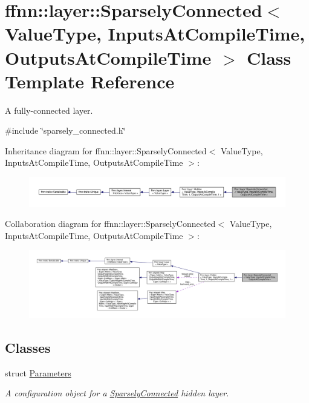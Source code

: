 \hypertarget{classffnn_1_1layer_1_1_sparsely_connected}{\section{ffnn\-:\-:layer\-:\-:Sparsely\-Connected$<$ Value\-Type, Inputs\-At\-Compile\-Time, Outputs\-At\-Compile\-Time $>$ Class Template Reference}
\label{classffnn_1_1layer_1_1_sparsely_connected}
}


A fully-\/connected layer.  




{\ttfamily \#include \char`\"{}sparsely\-\_\-connected.\-h\char`\"{}}



Inheritance diagram for ffnn\-:\-:layer\-:\-:Sparsely\-Connected$<$ Value\-Type, Inputs\-At\-Compile\-Time, Outputs\-At\-Compile\-Time $>$\-:\nopagebreak
\begin{figure}[H]
\begin{center}
\leavevmode
\includegraphics[width=350pt]{classffnn_1_1layer_1_1_sparsely_connected__inherit__graph}
\end{center}
\end{figure}


Collaboration diagram for ffnn\-:\-:layer\-:\-:Sparsely\-Connected$<$ Value\-Type, Inputs\-At\-Compile\-Time, Outputs\-At\-Compile\-Time $>$\-:\nopagebreak
\begin{figure}[H]
\begin{center}
\leavevmode
\includegraphics[width=350pt]{classffnn_1_1layer_1_1_sparsely_connected__coll__graph}
\end{center}
\end{figure}
\subsection*{Classes}
\begin{DoxyCompactItemize}
\item 
struct \hyperlink{structffnn_1_1layer_1_1_sparsely_connected_1_1_parameters}{Parameters}
\begin{DoxyCompactList}\small\item\em A configuration object for a \hyperlink{classffnn_1_1layer_1_1_sparsely_connected}{Sparsely\-Connected} hidden layer. \end{DoxyCompactList}\end{DoxyCompactItemize}
